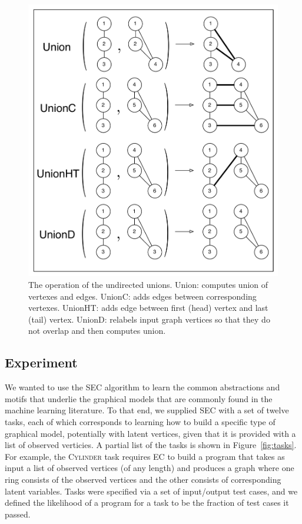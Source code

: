 \documentclass{article} %
\begin{document}
\begin{figure}[h]
\begin{minipage}[t]{.5\textwidth}
  \includegraphics[width=\linewidth]{./figures/GraphCombinators.pdf}
  \caption{The operation of the undirected unions. Union: computes union of vertexes and edges. UnionC: adds edges between corresponding vertexes. UnionHT: adds edge between first (head) vertex and last (tail) vertex. UnionD: relabels input graph vertices so that they do not overlap and then computes union.}
  \label{fig:graphcomb}\par\vfill
\end{minipage}
\end{figure}

\subsection{Experiment}

We wanted to use the SEC algorithm to learn the common abstractions and motifs that underlie the graphical models that are commonly found in the machine learning literature. To that end, we supplied SEC with a set of twelve tasks, each of which corresponds to learning how to build a specific type of graphical model, potentially with latent vertices, given that it is provided with a list of observed verticies. A partial list of the tasks is shown in Figure~\ref{fig:tasks}. For example, the \textsc{Cylinder} task requires EC to build a program that takes as input a list of observed vertices (of any length) and produces a graph where one ring consists of the observed vertices and the other consists of corresponding latent variables. 
Tasks were specified via a set of input/output test cases, and we defined the likelihood of a program for a task to be the fraction of test cases it passed. 
\end{document}
